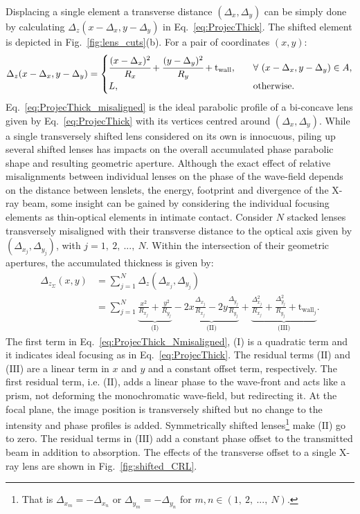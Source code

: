 \begin{refsection}
Displacing a single element a transverse distance $(\Delta_x,\Delta_y)$ can be simply done by calculating $\Delta_z(x-\Delta_x,y-\Delta_y)$ in Eq.~\ref{eq:ProjecThick}. The shifted element is depicted in Fig.~\ref{fig:lens_cuts}(b). For a pair of coordinates $(x,y)$:
\begin{equation}\label{eq:ProjecThick_misaligned}
    \Delta_z(x-\Delta_x,y-\Delta_y) = 
        \begin{cases}
      \cfrac{(x-\Delta_x)^2}{R_x}+\cfrac{(y-\Delta_y)^2}{R_y}+\text{t}_\text{wall}, &\quad\forall~(x-\Delta_x,y-\Delta_y) \in A,\\
      L, &\quad\text{otherwise}.
        \end{cases}
\end{equation}   
Eq.~\ref{eq:ProjecThick_misaligned} is the ideal parabolic profile of a bi-concave lens given by Eq.~\ref{eq:ProjecThick} with its vertices centred around $(\Delta_x,\Delta_y)$. While a single transversely shifted lens considered on its own is innocuous, piling up several shifted lenses has impacts on the overall accumulated phase parabolic shape and resulting geometric aperture. Although the exact effect of relative misalignments between individual lenses on the phase of the wave-field depends on the distance between lenslets, the energy, footprint and divergence of the X-ray beam, some insight can be gained by considering the individual focusing elements as thin-optical elements in intimate contact. Consider $N$ stacked lenses transversely misaligned with their transverse distance to the optical axis given by $(\Delta_{x_j},\Delta_{y_j})$, with $j=1,~2,~...,~N$. Within the intersection of their geometric apertures, the accumulated thickness is given by:
\begin{align}\label{eq:ProjecThick_Nmisaligned}
    \Delta_{z_\Sigma}(x,y) &= \sum\limits_{j=1}^N \Delta_z(\Delta_{x_j},\Delta_{y_j})\nonumber\\
    &=\sum\limits_{j=1}^N \underbrace{\frac{x^2}{R_{x_j}}+\frac{y^2}{R_{y_j}}}_\text{(I)}
    -\underbrace{2x\frac{\Delta_{x_j}}{R_{x_j}} - 2y\frac{\Delta_{y_j}}{R_{y_j}}}_\text{(II)}
    +\underbrace{\frac{\Delta_{x_j}^2}{R_{x_j}}+\frac{\Delta_{y_j}^2}{R_{y_j}}+\text{t}_{\text{wall}_j}}_\text{(III)}.
\end{align}
The first term in Eq.~\ref{eq:ProjecThick_Nmisaligned}, ($\text{I}$) is a quadratic term and it indicates ideal focusing as in Eq.~\ref{eq:ProjecThick}. The residual terms ($\text{II}$) and ($\text{III}$) are a linear term in $x$ and $y$ and a constant offset term, respectively. The first residual term, i.e. ($\text{II}$), adds a linear phase to the wave-front and acts like a prism, not deforming the monochromatic wave-field, but redirecting it. At the focal plane, the image position is transversely shifted but no change to the intensity and phase profiles is added. Symmetrically shifted lenses\footnote{That is $\Delta_{x_m}=-\Delta_{x_n}$ or $\Delta_{y_m}=-\Delta_{y_n}$ for $m,n\in(1,~2,~...,~N)$.} make ($\text{II}$) go to zero. The residual terms in ($\text{III}$) add a constant phase offset to the transmitted beam in addition to absorption. The effects of the transverse offset to a single X-ray lens are shown in Fig.~\ref{fig:shifted_CRL}.


\end{refsection}
